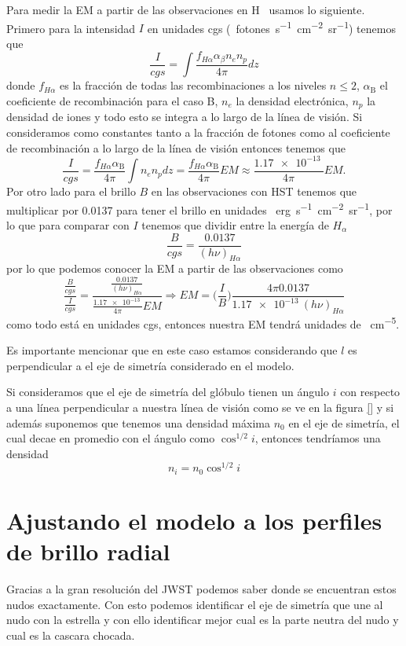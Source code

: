 \documentclass{book}
\begin{document}
Para medir la EM a partir de las observaciones en \unit{H\alpha} usamos lo siguiente. Primero para la intensidad $I$ en unidades cgs (\SI{}{fotones.s^{-1}.cm^{-2}.sr^{-1}}) tenemos que
\[\frac{I}{cgs}=\int \frac{f_{H\alpha}\alpha_\beta n_e n_p}{4\pi}dz\] donde $f_{H\alpha}$ es la fracción de todas las recombinaciones a los niveles $n\le 2$, $\alpha_\mathrm{B}$ el coeficiente de recombinación para el caso B, $n_e$ la densidad electrónica, $n_p$ la densidad de iones y todo esto se integra a lo largo de la línea de visión. Si consideramos como constantes tanto a la fracción de fotones como al coeficiente de recombinación a lo largo de la línea de visión entonces tenemos que
\[\frac{I}{cgs}=\frac{f_{H\alpha}\alpha_\mathrm{B}}{4\pi}\int n_en_pdz=\frac{f_{H\alpha}\alpha_\mathrm{B}}{4\pi} EM \approx \frac{\SI{1.17e-13}{}}{4\pi}EM.\]
Por otro lado para el brillo $B$ en las observaciones con  HST tenemos que multiplicar por 0.0137 para tener el brillo en unidades  \SI{}{erg.s^{-1}.cm^{-2}.sr^{-1}}, por lo que para comparar con $I$ tenemos que dividir entre la energía de $H_\alpha$
\[\frac{B}{cgs}=\frac{0.0137}{(h\nu)_{\unit{H\alpha}}}\] por lo que podemos conocer la EM a partir de las observaciones como 
\[\frac{\frac{B}{cgs}}{\frac{I}{cgs}}=\frac{\frac{0.0137}{(h\nu)_{\unit{H\alpha}}}}{\frac{\SI{1.17e-13}{}}{4\pi}EM}\Rightarrow EM = \Big(\frac{I}{B}\Big)\frac{4\pi 0.0137}{\SI{1.17e-13}{}(h\nu)_{\unit{H\alpha}}}\] como todo está en unidades cgs, entonces nuestra EM tendrá unidades de \SI{}{cm^{-5}}.

Es importante mencionar que en este caso estamos considerando que $l$ es perpendicular a el eje de simetría considerado en el modelo. 

Si consideramos que el eje de simetría del glóbulo tienen un ángulo $i$ con respecto a una línea perpendicular a nuestra línea de visión como se ve en la figura \ref{} y si además  suponemos que tenemos una densidad máxima $n_0$ en el eje de simetría, el cual decae en promedio con el ángulo como $\cos^{1/2} i$, entonces tendríamos  una densidad \[n_i = n_0\cos^{1/2} i\]

\section{Ajustando el modelo a los perfiles de brillo radial} \label{Sec : Ajuste de modelo}

Gracias a la gran resolución del JWST podemos saber donde se encuentran estos nudos exactamente. Con esto podemos identificar el eje de simetría que une al nudo con la estrella y con ello identificar mejor cual es la parte neutra del nudo y cual es la cascara chocada.
\end{document}
